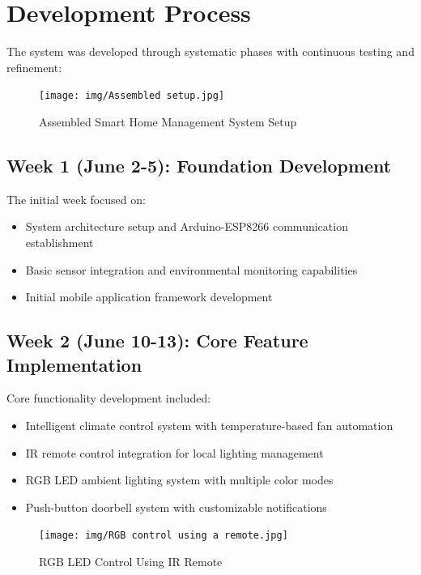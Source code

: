 \documentclass[12pt,a4paper]{report}
\begin{document}
\section{Development Process}

\noindent The system was developed through systematic phases with continuous testing and refinement:

\begin{figure}[H]
    \centering
    \texttt{[image: img/Assembled setup.jpg]}
    \caption{Assembled Smart Home Management System Setup}
    \label{fig:assembled-setup}
\end{figure}

\subsection{Week 1 (June 2-5): Foundation Development}
\noindent The initial week focused on:
\begin{itemize}
\item System architecture setup and Arduino-ESP8266 communication establishment
\item Basic sensor integration and environmental monitoring capabilities
\item Initial mobile application framework development
\end{itemize}

\newpage
\subsection{Week 2 (June 10-13): Core Feature Implementation}
\noindent Core functionality development included:
\begin{itemize}
\item Intelligent climate control system with temperature-based fan automation
\item IR remote control integration for local lighting management
\item RGB LED ambient lighting system with multiple color modes
\item Push-button doorbell system with customizable notifications
\end{itemize}

\begin{figure}[H]
    \centering
    \texttt{[image: img/RGB control using a remote.jpg]}
    \caption{RGB LED Control Using IR Remote}
    \label{fig:rgb-remote}
\end{figure}
\end{document}
